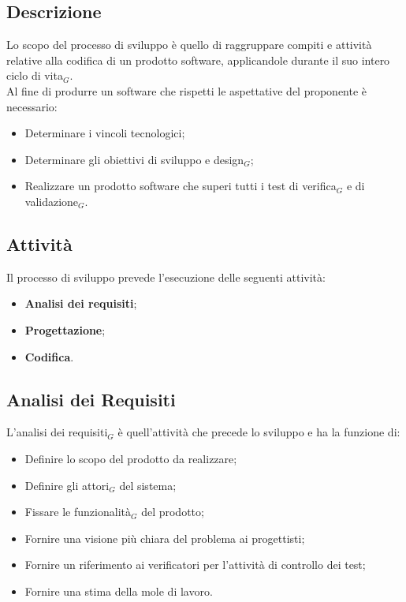 \subsection{Descrizione}
  Lo scopo del processo di sviluppo è quello di raggruppare compiti e attività relative alla codifica di un prodotto software, applicandole durante il suo intero ciclo di vita$_G$. \\
  Al fine di produrre un software che rispetti le aspettative del proponente è necessario:
  \begin{itemize}
    \item Determinare i vincoli tecnologici;
    \item Determinare gli obiettivi di sviluppo e design$_G$;
    \item Realizzare un prodotto software che superi tutti i test di verifica$_G$ e di validazione$_G$.
  \end{itemize}
  \subsection{Attività}

  Il processo di sviluppo prevede l'esecuzione delle seguenti attività:
  \begin{itemize}
    \item \textbf{Analisi dei requisiti};
    \item \textbf{Progettazione};
    \item \textbf{Codifica}.
  \end{itemize}
  \subsection{Analisi dei Requisiti}
    L'analisi dei requisiti$_G$ è quell'attività che precede lo sviluppo e ha la funzione di:
    \begin{itemize}
      \item Definire lo scopo del prodotto da realizzare;
      \item Definire gli attori$_G$ del sistema;
      \item Fissare le funzionalità$_G$ del prodotto;
      \item Fornire una visione più chiara del problema ai progettisti;
      \item Fornire un riferimento ai verificatori per l'attività di controllo dei test;
      \item Fornire una stima della mole di lavoro.
    \end{itemize}
